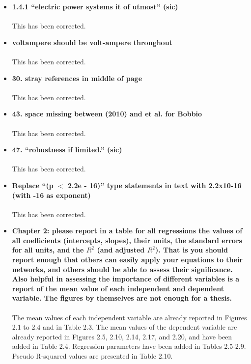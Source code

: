 \documentclass[a4paper,10pt]{article}
\begin{document}
\begin{itemize}
 \item \textbf{1.4.1 ``electric power systems it of utmost'' (sic)}\\
 \\
 This has been corrected. 
 
 \item \textbf{voltampere should be volt-ampere throughout}\\
 \\
 This has been corrected. 
  
 \item \textbf{30. stray references in middle of page}\\
 \\
 This has been corrected. 
 
 \item \textbf{43. space missing between (2010) and et al. for Bobbio}\\
 \\
 This has been corrected.
 
 \item \textbf{47.  ``robustness if limited.'' (sic)}\\
 \\
 This has been corrected. 
 
 \item \textbf{Replace ``(p $<$ 2.2e - 16)'' type statements in text with 2.2x10-16  (with -16 as exponent)}\\
 \\
 This has been corrected. 
 
 \item \textbf{Chapter 2: please report in a table for all regressions the values of all coefficients (intercepts, slopes), their units, the standard errors for all units, and the $R^2$ (and adjusted $R^2$).   That is you should report enough that others can easily apply your equations to their networks, and others should be able to assess their significance.  Also helpful in assessing the importance of different variables is a report of the mean value of each independent and dependent variable.  The figures by themselves are not enough for a thesis.}\\
 \\
 The mean values of each independent variable are already reported in Figures 2.1 to 2.4 and in Table 2.3.  The mean values of the dependent variable are already reported in Figures 2.5, 2.10, 2.14, 2.17, and 2.20, and have been added in Table 2.4.  Regression parameters have been added in Tables 2.5-2.9. Pseudo R-squared values are presented in Table 2.10.
 

\end{itemize}
\end{document}

